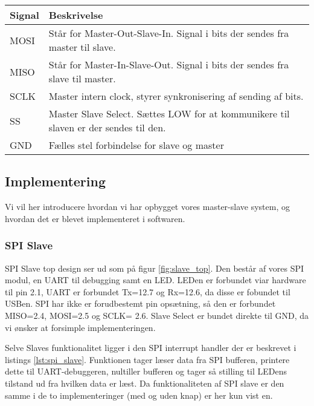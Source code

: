 \documentclass[../main.tex]{subfiles}
\begin{document}

\begin{center}
\begin{tabular}{ | m{5em} | m{5cm}| } 
\hline
\textbf{Signal}& \textbf{Beskrivelse}\\ 
\hline
MOSI& Står for Master-Out-Slave-In. Signal i bits der sendes  fra master til slave.\\ 
\hline
MISO& Står for Master-In-Slave-Out. Signal i bits der sendes fra slave til master.\\ 
\hline
SCLK& Master intern clock, styrer synkronisering af sending af bits. \\ 
\hline
SS& Master Slave Select. Sættes LOW for at kommunikere til slaven er der sendes til den.\\
\hline
GND& Fælles stel forbindelse for slave og master\\
\hline
\end{tabular}
\end{center}

\subsection{Implementering}

Vi vil her introducere hvordan vi har opbygget vores master-slave system, og hvordan det er blevet implementeret i softwaren.

\subsubsection{SPI Slave}

SPI Slave top design ser ud som på figur \ref{fig:slave_top}. Den består af vores SPI modul, en UART til debugging samt en LED. LEDen er forbundet viar hardware til pin 2.1, UART er forbundet Tx=12.7 og Rx=12.6, da disse er fobundet til USBen. SPI har ikke er forudbestemt pin opsætning, så den er forbundet MISO=2.4, MOSI=2.5 og SCLK= 2.6. Slave Select er bundet direkte til GND, da vi ønsker at forsimple implementeringen. 


Selve Slaves funktionalitet ligger i den SPI interrupt handler der er beskrevet i listings \ref{lst:spi_slave}. Funktionen tager læser data fra SPI bufferen, printere dette til UART-debuggeren, nultiller bufferen og tager så stilling til LEDens tilstand ud fra hvilken data er læst. Da funktionaliteten af SPI slave er den samme i de to implementeringer (med og uden knap) er her kun vist en.
\end{document}
